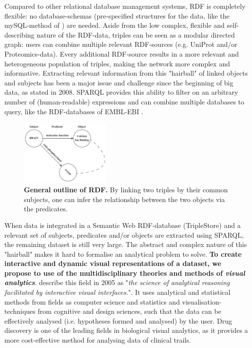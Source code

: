 \documentclass[twoside,fontsize=10pt]{article}
\begin{document}
Compared to other relational database management systems, RDF is completely flexible: no database-schemas (pre-specified structures for the data, like the mySQL-method of \citet{Low2013}) are needed. Aside from the low complex, flexible and self-describing nature of the RDF-data, triples can be seen as a modular directed graph: users can combine multiple relevant RDF-sources (e.g. UniProt and/or Proteomics-data). Every additional RDF-source results in a more relevant and heterogeneous population of triples, making the network more complex and informative. Extracting relevant information from this "hairball" of linked objects and subjects has been a major issue and challenge since the beginning of big data, as \citet{Pavlopoulos2008} stated in 2008. SPARQL provides this ability to filter on an arbitrary number of (human-readable) expressions and can combine multiple databases to query, like the RDF-databases of EMBL-EBI \citep{Jupp2014}. 
\medskip
\begin{figure}[H]
    \centering
    \includegraphics[width=0.4\textwidth]{rdf}
    \caption{\textbf{General outline of RDF.} By linking two triples by their common subjects, one can infer the relationship between the two objects via the predicates.}
    \label{fig:rdf}
\end{figure}
\noindent
When data is integrated in a Semantic Web RDF-database (TripleStore) and a relevant set of subjects, predicates and/or objects are extracted using SPARQL, the remaining dataset is still very large. The abstract and complex nature of this "hairball" makes it hard to formalise an analytical problem to solve. \textbf{To create interactive and dynamic visual representations of a dataset, we propose to use of the multidisciplinary theories and methods of \textit{visual analytics}}. \citet{Thomas2005} describe this field in 2005 as "\textit{the science of analytical reasoning facilitated by interactive visual interfaces.}". It uses analytical and statistical methods from fields as computer science and statistics and visualisation-techniques from cognitive and design sciences, such that the data can be effectively analysed (i.e. hypotheses formed and analysed) by the user. Drug discovery is one of the leading fields in biological visual analytics, as it provides a more cost-effective method for analysing data of clinical trails\cite{Cao2008}.
\end{document}
